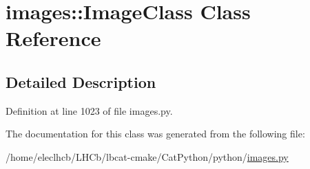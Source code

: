 \hypertarget{classimages_1_1ImageClass}{
\section{images::ImageClass Class Reference}
\label{classimages_1_1ImageClass}
}


\subsection{Detailed Description}


Definition at line 1023 of file images.py.

The documentation for this class was generated from the following file:\begin{DoxyCompactItemize}
\item 
/home/eleclhcb/LHCb/lbcat-\/cmake/CatPython/python/\hyperlink{images_8py}{images.py}\end{DoxyCompactItemize}
